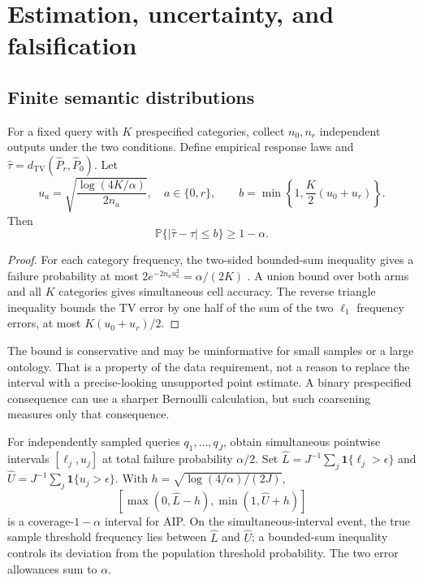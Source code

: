 \documentclass[11pt,letterpaper]{article}
\theoremstyle{definition}\newtheorem{definition}[theorem]{Definition}
\newcommand{\TV}{d_{\mathrm{TV}}}
\newcommand{\Prob}{\mathbb{P}}
\newcommand{\ind}{\mathbf{1}}
\begin{document}
\section{Estimation, uncertainty, and falsification}
\subsection{Finite semantic distributions}
For a fixed query with $K$ prespecified categories, collect $n_0,n_r$ independent outputs under the two conditions. Define empirical response laws and $\widehat\tau=\TV(\widehat P_r,\widehat P_0)$. Let
\begin{equation}
u_a=\sqrt{\frac{\log(4K/\alpha)}{2n_a}},\quad a\in\{0,r\},
\qquad b=\min\!\left\{1,\frac K2(u_0+u_r)\right\}.
\end{equation}
Then
\begin{equation}
\Prob\{|\widehat\tau-\tau|\le b\}\ge1-\alpha.
\label{eq:tvci}
\end{equation}
\begin{proof}
For each category frequency, the two-sided bounded-sum inequality gives a failure probability at most $2e^{-2n_au_a^2}=\alpha/(2K)$ \cite{hoeffding1963}. A union bound over both arms and all $K$ categories gives simultaneous cell accuracy. The reverse triangle inequality bounds the TV error by one half of the sum of the two $\ell_1$ frequency errors, at most $K(u_0+u_r)/2$.
\end{proof}
The bound is conservative and may be uninformative for small samples or a large ontology. That is a property of the data requirement, not a reason to replace the interval with a precise-looking unsupported point estimate. A binary prespecified consequence can use a sharper Bernoulli calculation, but such coarsening measures only that consequence.

For independently sampled queries $q_1,\ldots,q_J$, obtain simultaneous pointwise intervals $[\ell_j,u_j]$ at total failure probability $\alpha/2$. Set $\widehat L=J^{-1}\sum_j\ind\{\ell_j>\epsilon\}$ and $\widehat U=J^{-1}\sum_j\ind\{u_j>\epsilon\}$. With $h=\sqrt{\log(4/\alpha)/(2J)}$,
\begin{equation}
\left[\max(0,\widehat L-h),\min(1,\widehat U+h)\right]
\label{eq:aipci}
\end{equation}
is a coverage-$1-\alpha$ interval for AIP. On the simultaneous-interval event, the true sample threshold frequency lies between $\widehat L$ and $\widehat U$; a bounded-sum inequality controls its deviation from the population threshold probability. The two error allowances sum to $\alpha$.
\end{document}
